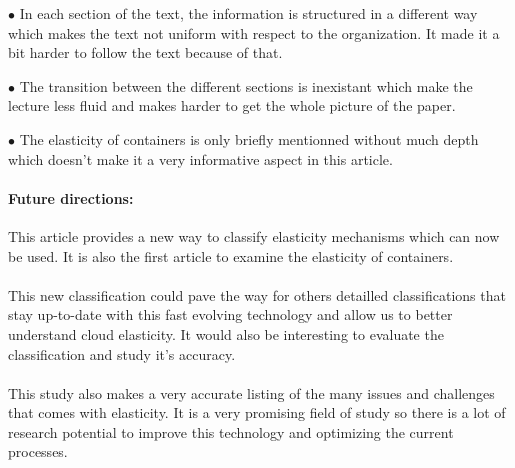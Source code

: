\documentclass[11pt]{article}
\begin{document}
\begin{minipage}[t]{1\textwidth}
    \begin{description}
        \item $\bullet$ In each section of the text, the information is structured in a different way which makes the text not uniform with respect to the organization. It made it a bit harder to follow the text because of that. 
        \item $\bullet$ The transition between the different sections is inexistant which make the lecture less fluid and makes harder to get the whole picture of the paper.
        \item $\bullet$ The elasticity of containers is only briefly mentionned without much depth which doesn't make it a very informative aspect in this article. 
    \end{description}
\end{minipage}

\paragraph{Future directions:}
This article provides a new way to classify elasticity mechanisms which can now be used. It is also the first article to examine the elasticity of containers. 
\\
\\
This new classification could pave the way for others detailled classifications that stay up-to-date with this fast evolving technology and allow us to better understand cloud elasticity. It would also be interesting to evaluate the classification and study it's accuracy. 
\\
\\
This study also makes a very accurate listing of the many issues and challenges that comes with elasticity. It is a very promising field of study so there is a lot of research potential to improve this technology and optimizing the current processes. 
\end{document}
